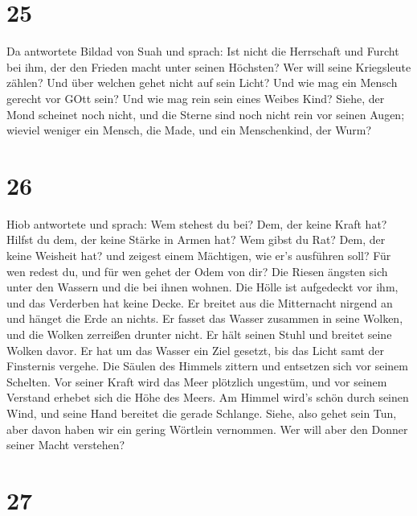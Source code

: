 \hypertarget{section-24}{%
\section{25}\label{section-24}}

 Da antwortete Bildad von Suah und sprach:  Ist
nicht die Herrschaft und Furcht bei ihm, der den Frieden macht unter
seinen Höchsten?  Wer will seine Kriegsleute zählen? Und
über welchen gehet nicht auf sein Licht?  Und wie mag ein
Mensch gerecht vor GOtt sein? Und wie mag rein sein eines Weibes Kind?
 Siehe, der Mond scheinet noch nicht, und die Sterne sind
noch nicht rein vor seinen Augen;  wieviel weniger ein
Mensch, die Made, und ein Menschenkind, der Wurm?

\hypertarget{section-25}{%
\section{26}\label{section-25}}

 Hiob antwortete und sprach:  Wem stehest du
bei? Dem, der keine Kraft hat? Hilfst du dem, der keine Stärke in Armen
hat?  Wem gibst du Rat? Dem, der keine Weisheit hat? und
zeigest einem Mächtigen, wie er's ausführen soll?  Für wen
redest du, und für wen gehet der Odem von dir?  Die Riesen
ängsten sich unter den Wassern und die bei ihnen wohnen. 
Die Hölle ist aufgedeckt vor ihm, und das Verderben hat keine Decke.
 Er breitet aus die Mitternacht nirgend an und hänget die
Erde an nichts.  Er fasset das Wasser zusammen in seine
Wolken, und die Wolken zerreißen drunter nicht.  Er hält
seinen Stuhl und breitet seine Wolken davor.  Er hat um das
Wasser ein Ziel gesetzt, bis das Licht samt der Finsternis vergehe.
 Die Säulen des Himmels zittern und entsetzen sich vor
seinem Schelten.  Vor seiner Kraft wird das Meer plötzlich
ungestüm, und vor seinem Verstand erhebet sich die Höhe des Meers.
 Am Himmel wird's schön durch seinen Wind, und seine Hand
bereitet die gerade Schlange.  Siehe, also gehet sein Tun,
aber davon haben wir ein gering Wörtlein vernommen. Wer will aber den
Donner seiner Macht verstehen?

\hypertarget{section-26}{%
\section{27}\label{section-26}}


